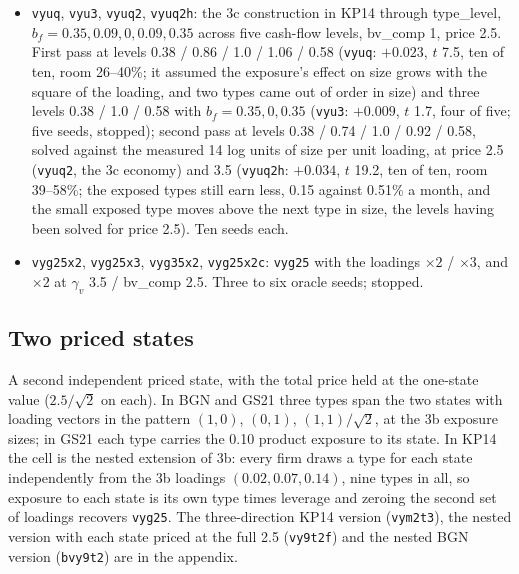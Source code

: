 \documentclass[11pt]{article}
\begin{document}
\begin{itemize}
\item \texttt{vyuq}, \texttt{vyu3}, \texttt{vyuq2}, \texttt{vyuq2h}: the 3c construction in KP14 through type\_level, $b_f = 0.35, 0.09, 0, 0.09, 0.35$ across five cash-flow levels, bv\_comp 1, price 2.5. First pass at levels 0.38 / 0.86 / 1.0 / 1.06 / 0.58 (\texttt{vyuq}: $+0.023$, $t$ 7.5, ten of ten, room 26--40\%; it assumed the exposure's effect on size grows with the square of the loading, and two types came out of order in size) and three levels 0.38 / 1.0 / 0.58 with $b_f = 0.35, 0, 0.35$ (\texttt{vyu3}: $+0.009$, $t$ 1.7, four of five; five seeds, stopped); second pass at levels 0.38 / 0.74 / 1.0 / 0.92 / 0.58, solved against the measured 14 log units of size per unit loading, at price 2.5 (\texttt{vyuq2}, the 3c economy) and 3.5 (\texttt{vyuq2h}: $+0.034$, $t$ 19.2, ten of ten, room 39--58\%; the exposed types still earn less, 0.15 against 0.51\% a month, and the small exposed type moves above the next type in size, the levels having been solved for price 2.5). Ten seeds each.
\item \texttt{vyg25x2}, \texttt{vyg25x3}, \texttt{vyg35x2}, \texttt{vyg25x2c}: \texttt{vyg25} with the loadings $\times2$ / $\times3$, and $\times2$ at $\gamma_v$ 3.5 / bv\_comp 2.5. Three to six oracle seeds; stopped.
\end{itemize}

\subsection*{Two priced states}
A second independent priced state, with the total price held at the one-state value ($2.5/\sqrt2$ on each). In BGN and GS21 three types span the two states with loading vectors in the pattern $(1,0)$, $(0,1)$, $(1,1)/\sqrt2$, at the 3b exposure sizes; in GS21 each type carries the 0.10 product exposure to its state. In KP14 the cell is the nested extension of 3b: every firm draws a type for each state independently from the 3b loadings $(0.02, 0.07, 0.14)$, nine types in all, so exposure to each state is its own type times leverage and zeroing the second set of loadings recovers \texttt{vyg25}. The three-direction KP14 version (\texttt{vym2t3}), the nested version with each state priced at the full 2.5 (\texttt{vy9t2f}) and the nested BGN version (\texttt{bvy9t2}) are in the appendix.

\end{document}
